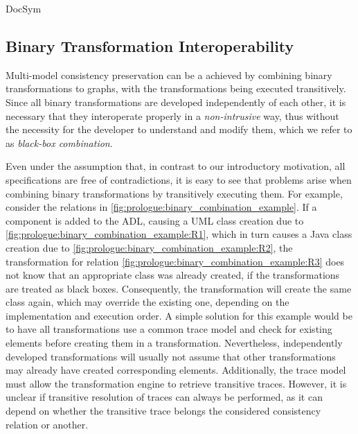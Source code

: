 \begin{copiedFrom}{DocSym}

\subsection{Binary Transformation Interoperability}
\label{sec:approach:interoperability}

Multi-model consistency preservation can be a achieved by combining binary transformations to graphs, %
with the transformations being executed transitively.
Since all binary transformations are developed independently of each other, it is necessary that they interoperate properly in a \emph{non-intrusive} way, thus without the necessity for the developer to understand and modify them, which we refer to as \emph{black-box combination}.

Even under the assumption that, in contrast to our introductory motivation, all specifications are free of contradictions, it is easy to see that problems arise when combining binary transformations by transitively executing them.
For example, consider the relations in \autoref{fig:prologue:binary_combination_example}.
If a component is added to the \ac{ADL}, causing a \ac{UML} class creation due to \ref{fig:prologue:binary_combination_example:R1}, which in turn causes a Java class creation due to \ref{fig:prologue:binary_combination_example:R2}, the transformation for relation \ref{fig:prologue:binary_combination_example:R3} does not know that an appropriate class was already created, if the transformations are treated as black boxes.
Consequently, the transformation will create the same class again, which may override the existing one, depending on the implementation and execution order.
A simple solution for this example would be to have all transformations use a common trace model and check for existing elements before creating them in a transformation.
Nevertheless, independently developed transformations will usually not assume that %
other transformations may already have created corresponding elements.
Additionally, the trace model must allow the transformation engine to retrieve transitive traces.
However, it is unclear if transitive resolution of traces can always be performed, as it can depend on whether the transitive trace belongs the considered consistency relation or another.


\end{copiedFrom}

